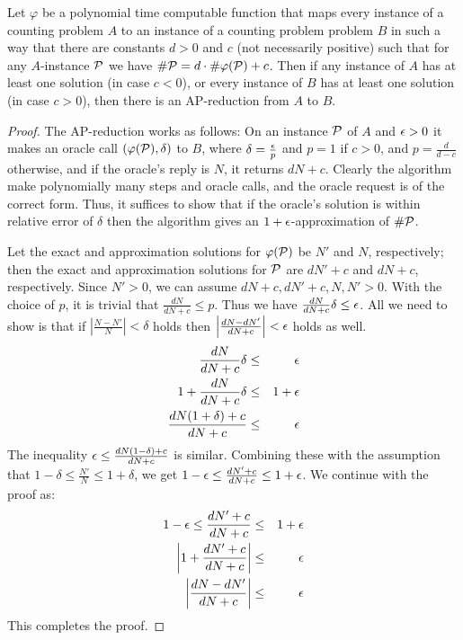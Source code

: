 \begin{lemma}\label{lem:linear}
Let \(\varphi\) be a polynomial time computable function that maps every instance of a
counting problem \(A\) to an instance of a counting problem problem \(B\) in such a way that
there are constants \(d > 0\) and \(c\) (not necessarily positive) such that
for any \(A\)-instance \(\mathcal{P}\) we have
\(\#\mathcal{P} = d\cdot \#\varphi(\mathcal{P}) + c\)\@. Then if any instance of \(A\)
has at least one solution 
(in case \(c < 0\)), or every instance of \(B\) has at least one solution (in case \(c>0\)), then
there is an AP-reduction from \(A\) to \(B\)\@.
\end{lemma}

\begin{proof}
The AP-reduction works as follows: On an instance \(\mathcal{P}\) of \(A\) and \(\epsilon > 0\) it makes 
an oracle call \((\varphi(\mathcal{P}),\delta)\) to \(B\), where \(\delta = \frac{\epsilon}{p}\) and 
\(p = 1\) if \(c > 0\), and \(p = \frac{d}{d-c}\) otherwise,
and if the oracle's reply is \(N\), it returns \(dN + c\)\@. Clearly the algorithm make polynomially 
many steps and oracle calls, and the oracle request is of the correct form.
Thus, it suffices to show that if the oracle's solution is within relative error of \(\delta\) then
the algorithm gives an \(1+\epsilon\)-approximation of \(\#\mathcal{P}\)\@.

Let the exact and approximation solutions for \(\varphi(\mathcal{P})\) be \(N'\) and \(N\), respectively;
then the exact and approximation solutions for \(\mathcal{P}\) are  
\(dN' +c\) and \(dN + c\), respectively. Since \(N' > 0\), we can 
assume \(dN+c,dN'+c,N,N'>0\)\@. With the choice of \(p\), it is trivial that
 \(\frac{dN}{dN+c} \le p\)\@. Thus we have \(\frac{dN}{dN+c}\delta \le \epsilon\).
All we need to show is that if \(\left|\frac{N-N'}{N}\right|<\delta\) holds then
\(\left|\frac{dN-dN'}{dN+c}\right|<\epsilon\) holds as well.
\begin{eqnarray*}
\frac{dN}{dN+c}\delta & \le & \epsilon \\
1 + \frac{dN}{dN+c}\delta & \le & 1 + \epsilon \\
\frac{d N (1+\delta)+c}{d N + c} & \le & \epsilon \\
\end{eqnarray*}
The inequality \(\epsilon \le \frac{d N (1-\delta)+c}{d N + c}\) is similar.
Combining these with the assumption that \(1-\delta \le \frac{N'}{N} \le 1 + \delta \),
we get \(1-\epsilon \le \frac{dN'+c}{dN+c} \le 1 + \epsilon\). We continue with the proof as:
\begin{eqnarray*}
1-\epsilon \le \frac{dN'+c}{dN+c} & \le & 1 + \epsilon \\
\left|1 + \frac{dN' + c}{dN + c}\right| &\le & \epsilon \\
\left| \frac{dN-dN'}{dN+c}\right| & \le& \epsilon
\end{eqnarray*}
This completes the proof.
\end{proof}

